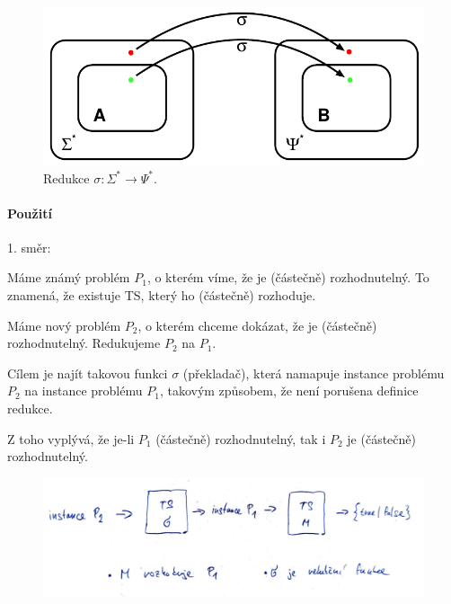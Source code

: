 \begin{figure}[H]
    \centering
    \includegraphics[width=0.75\linewidth]{redukce.pdf}
    \caption*{Redukce $\sigma : \Sigma^* \rightarrow \Psi^*$.}
\end{figure}

\paragraph*{Použití} \begin{compactitem}
    \item 1. směr: \begin{compactitem}
        \item Máme známý problém $P_1$, o kterém víme, že je (částečně) rozhodnutelný. To znamená, že existuje TS, který ho (částečně) rozhoduje.

        \item Máme nový problém $P_2$, o kterém chceme dokázat, že je (částečně) rozhodnutelný. Redukujeme $P_2$ na $P_1$.

        \item Cílem je najít takovou funkci $\sigma$ (překladač), která namapuje instance problému $P_2$ na instance problému $P_1$, takovým způsobem, že není porušena definice redukce.

        \item Z toho vyplývá, že je-li $P_1$ (částečně) rozhodnutelný, tak i $P_2$ je (částečně) rozhodnutelný.
    \end{compactitem}

    \begin{figure}[H]
        \centering
        \includegraphics[width=1\linewidth]{redukce_1.pdf}
    \end{figure}


\end{compactitem}
